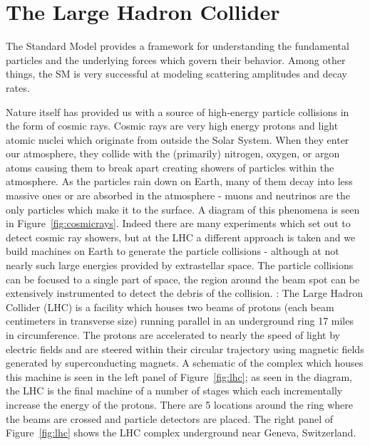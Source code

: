 \chapter{The Large Hadron Collider}
\label{chap:lhc}

The Standard Model provides a framework for understanding the fundamental particles and the underlying forces which govern their behavior. Among other things, the SM is very successful at modeling scattering amplitudes and decay rates. 

Nature itself has provided us with a source of high-energy particle collisions in the form of cosmic rays. Cosmic rays are very high energy protons and light atomic nuclei which originate from outside the Solar System. When they enter our atmosphere, they collide with the (primarily) nitrogen, oxygen, or argon atoms causing them to break apart creating showers of particles within the atmosphere. As the particles rain down on Earth, many of them decay into less massive ones or are absorbed in the atmosphere - muons and neutrinos are the only particles which make it to the surface. A diagram of this phenomena is seen in Figure~\ref{fig:cosmicrays}. Indeed there are many experiments which set out to detect cosmic ray showers, but at the LHC a different approach is taken and we build machines on Earth to generate the particle collisions - although at not nearly such large energies provided by extrastellar space. The particle collisions can be focused to a single part of space, the region around the beam spot can be extensively instrumented to detect the debris of the collision. 
:
The Large Hadron Collider (LHC) is a facility which houses two beams of protons (each beam centimeters in transverse size) running parallel in an underground ring 17 miles in circumference. The protons are accelerated to nearly the speed of light by electric fields and are steered within their circular trajectory using magnetic fields generated by superconducting magnets. A schematic of the complex which houses this machine is seen in the left panel of Figure~\ref{fig:lhc}; as seen in the diagram, the LHC is the final machine of a number of stages which each incrementally increase the energy of the protons. There are 5 locations around the ring where the beams are crossed and particle detectors are placed. The right panel of Figure~\ref{fig:lhc} shows the LHC complex underground near Geneva, Switzerland.

